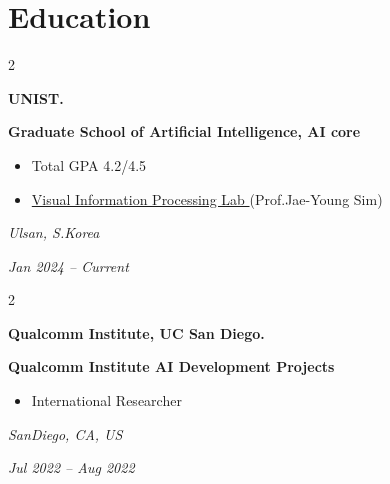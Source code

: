 \documentclass[10pt, letterpaper]{article}
\newenvironment{highlights}{
    \begin{itemize}[
        topsep=0.10 cm,
        parsep=0.10 cm,
        partopsep=0pt,
        itemsep=0pt,
        leftmargin=0.4 cm + 10pt
    ]
}{
    \end{itemize}
} %
\newenvironment{twocolentry}[2][]{
    \onecolentry
    \def\secondColumn{#2}
    \setcolumnwidth{\fill, 3.5 cm}
    \begin{paracol}{2}
}{
    \switchcolumn \raggedleft \secondColumn
    \end{paracol}
    \endonecolentry
} %
\let\hrefWithoutArrow\href
\renewcommand{\href}[2]{\hrefWithoutArrow{#1}{\ifthenelse{\equal{#2}{}}{ }{#2 }\raisebox{.15ex}{\footnotesize \faExternalLink*}}}
\begin{document}
    \section{Education}
        \begin{twocolentry}{
            \small\textit{Ulsan, S.Korea}
            
            \vspace{0.2cm}
            
            \textit{Jan 2024 – Current}
        }
            \textbf{\color{headingOrange}UNIST.}
            
            \vspace{0.2cm}
            
            \textbf{Graduate School of Artificial Intelligence, AI core}
            \begin{highlights}
                \item Total GPA 4.2/4.5
                \item \hrefWithoutArrow{https://vip.unist.ac.kr/}{Visual Information Processing Lab \faLink}(Prof.Jae-Young Sim)
            \end{highlights}
        \end{twocolentry}

        \begin{twocolentry}{
            \small\textit{SanDiego, CA, US}
            
            \vspace{0.2cm}
            
            \textit{Jul 2022 – Aug 2022}
        }
            \textbf{\color{headingOrange}Qualcomm Institute, UC San Diego.}
            
            \vspace{0.2cm}
            
            \textbf{Qualcomm Institute AI Development Projects}
            \begin{highlights}
                \item International Researcher
            \end{highlights}
        \end{twocolentry}
        
\end{document}
